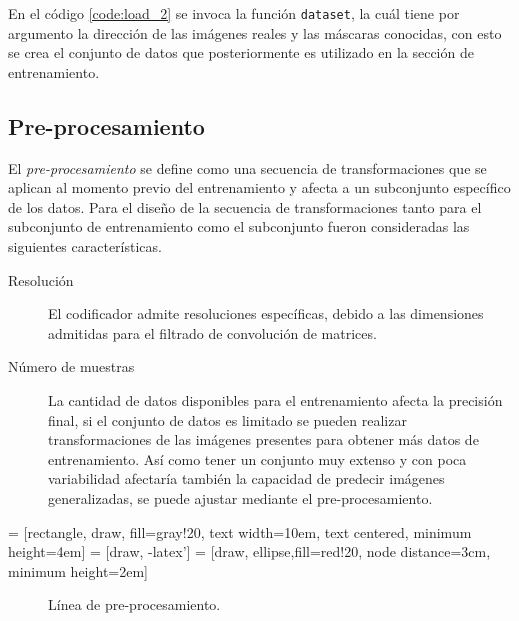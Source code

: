 En el código \ref{code:load_2} se invoca la función \texttt{dataset}, la cuál tiene por argumento la dirección de las imágenes reales y las máscaras conocidas, con esto se crea el conjunto de datos que posteriormente es utilizado en la sección de entrenamiento.


\subsection{Pre-procesamiento}
El \emph{pre-procesamiento} se define como una secuencia de transformaciones que se aplican al momento previo del entrenamiento y afecta a un subconjunto específico de los datos. Para el diseño de la secuencia de transformaciones tanto para el subconjunto de entrenamiento como el subconjunto fueron consideradas las siguientes características.

\begin{description}
    \item[Resolución]{ El codificador admite resoluciones específicas, debido a las dimensiones admitidas para el filtrado de convolución de matrices.}
    \item[Número de muestras]{La cantidad de datos disponibles para el entrenamiento afecta la precisión final, si el conjunto de datos es limitado se pueden realizar transformaciones de las imágenes presentes para obtener más datos de entrenamiento. Así como tener un conjunto muy extenso y con poca variabilidad afectaría también la capacidad de predecir imágenes generalizadas, se puede ajustar mediante el pre-procesamiento.}
    \item[] 
\end{description}


 = [rectangle, draw, fill=gray!20, 
    text width=10em, text centered, minimum height=4em]
 = [draw, -latex']
 = [draw, ellipse,fill=red!20, node distance=3cm,
    minimum height=2em]

\begin{figure}[H]
    \centering
    \begin{adjustbox}{width=0.9\linewidth}
    \end{adjustbox}
    \caption{Línea de pre-procesamiento.}
    \label{fig: pipeline}
\end{figure}


